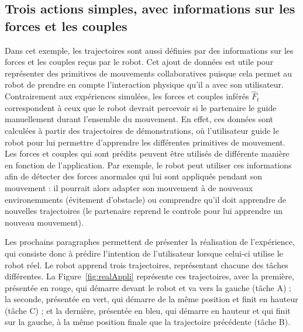 \documentclass[utf8]{frontiersSCNS} %
\newcommand{\comment}[1]{}
\begin{document}
\subsection{Trois actions simples, avec informations sur les forces et les couples}
\comment{torseur = forces + moment de couple}
Dans cet exemple, les trajectoires sont aussi définies par des informations sur les forces et les couples reçus par le robot. Cet ajout de données est utile pour représenter des primitives de mouvements collaboratives puisque cela permet au robot de prendre en compte l'interaction physique qu'il a avec son utilisateur.
Contrairement aux expériences simulées, les forces et couples inférés $\hat{F}_t$ correspondent à ceux que le robot devrait percevoir si le partenaire le guide manuellement durant l'ensemble du mouvement. En effet, ces données sont calculées à partir des trajectoires de démonstrations, où l'utilisateur guide le robot pour lui permettre d'apprendre les différentes primitives de mouvement. 
Les forces et couples qui sont prédits peuvent être utilisés de différente manière en fonction de l'application.
Par exemple, le robot peut utiliser ces informations afin de détecter des forces anormales qui lui sont appliqués pendant son mouvement : il pourrait alors adapter son mouvement à de nouveaux environemments (évitement d'obstacle) ou comprendre qu'il doit apprendre de nouvelles trajectoires (le partenaire reprend le controle pour lui apprendre un nouveau mouvement).

Les prochains paragraphes permettent de présenter la réalisation de l'expérience, qui consiste donc à prédire l'intention de l'utilisateur lorsque celui-ci utilise le robot réel.
Le robot apprend trois trajectoires, représentant chacune des tâches différentes. La Figure~\ref{fig:realAppli} représente ces trajectoires, avec la première, présentée en rouge, qui démarre devant le robot et va vers la gauche (tâche A) ; la seconde, présentée en vert, qui démarre de la même position et finit en hauteur (tâche C) ; et la dernière, présentée en bleu, qui démarre en hauteur et qui finit sur la gauche, à la même position finale que la trajectoire précédente (tâche B).
\end{document}
